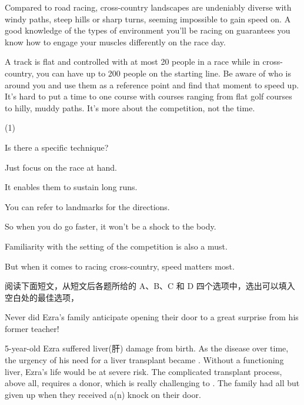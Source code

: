 \documentclass{英语试卷}
\begin{document}
\par {} Compared to road racing, cross-country landscapes are undeniably diverse with windy paths, steep hills or sharp turns, seeming impossible to gain speed on. A good knowledge of the types of environment you'll be racing on guarantees you know how to engage your muscles differently on the race day.\par
\par A track is flat and controlled with at most 20 people in a race while in cross-country, you can have up to 200 people on the starting line. Be aware of who is around you and use them as a reference point and find that moment to speed up. It's hard to put a time to one course with courses ranging from flat golf courses to hilly, muddy paths.  It's more about the competition, not the time.\par
\begin{choices}(1)
  \item Is there a specific technique?
  \item Just focus on the race at hand.
  \item It enables them to sustain long runs.
  \item You can refer to landmarks for the directions.
  \item So when you do go faster, it won't be a shock to the body.
  \item Familiarity with the setting of the competition is also a must.
  \item But when it comes to racing cross-country, speed matters most.
\end{choices}
\par 阅读下面短文，从短文后各题所给的 A、B、C 和 D 四个选项中，选出可以填入空白处的最佳选项，\par
\par Never did Ezra's family anticipate opening their door to a great surprise from his former teacher!\par
\par 5-year-old Ezra suffered liver(肝) damage from birth. As the disease  over time, the urgency of his need for a liver transplant became . Without a functioning liver, Ezra's life would be at severe risk. The complicated transplant process, above all, requires a  donor, which is really challenging to . The family had all but given up  when they received a(n)  knock on their door.\par
\end{document}
